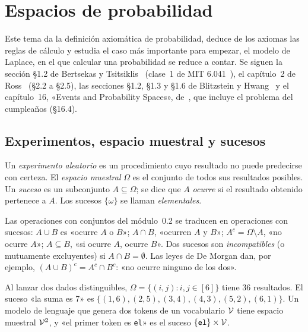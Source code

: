 \chapter{Espacios de probabilidad}
\label{tema:3}

Este tema da la definición axiomática de probabilidad, deduce de los axiomas las reglas de cálculo y estudia el caso más importante para empezar, el modelo de Laplace, en el que calcular una probabilidad se reduce a contar. Se siguen la sección §1.2 de Bertsekas y Tsitsiklis~\cite{bt} (clase~1 de MIT 6.041~\cite{mit6041f10}), el capítulo~2 de Ross~\cite{ross} (§2.2 a §2.5), las secciones §1.2, §1.3 y §1.6 de Blitzstein y Hwang~\cite{bh} y el capítulo~16, «Events and Probability Spaces», de~\cite{mcs}, que incluye el problema del cumpleaños (§16.4).

\section{Experimentos, espacio muestral y sucesos}

\begin{definicion}
Un \emph{experimento aleatorio} es un procedimiento cuyo resultado no puede predecirse con certeza. El \emph{espacio muestral} $\Omega$ es el conjunto de todos sus resultados posibles. Un \emph{suceso} es un subconjunto $A\subseteq\Omega$; se dice que $A$ \emph{ocurre} si el resultado obtenido pertenece a $A$. Los sucesos $\{\omega\}$ se llaman \emph{elementales}.
\end{definicion}

Las operaciones con conjuntos del módulo~0.2 se traducen en operaciones con sucesos: $A\cup B$ es «ocurre $A$ o $B$»; $A\cap B$, «ocurren $A$ y $B$»; $A^{c}=\Omega\setminus A$, «no ocurre $A$»; $A\subseteq B$, «si ocurre $A$, ocurre $B$». Dos sucesos son \emph{incompatibles} (o mutuamente excluyentes) si $A\cap B=\emptyset$. Las leyes de De Morgan dan, por ejemplo, $(A\cup B)^{c}=A^{c}\cap B^{c}$: «no ocurre ninguno de los dos».

\begin{ejemplo}\label{ej:t3-omega}
Al lanzar dos dados distinguibles, $\Omega=\{(i,j):i,j\in[6]\}$ tiene 36 resultados. El suceso «la suma es 7» es $\{(1,6),(2,5),(3,4),(4,3),(5,2),(6,1)\}$. Un modelo de lenguaje que genera dos tokens de un vocabulario $\mathcal{V}$ tiene espacio muestral $\mathcal{V}^{2}$, y «el primer token es \texttt{el}» es el suceso $\{\texttt{el}\}\times\mathcal{V}$.
\end{ejemplo}

